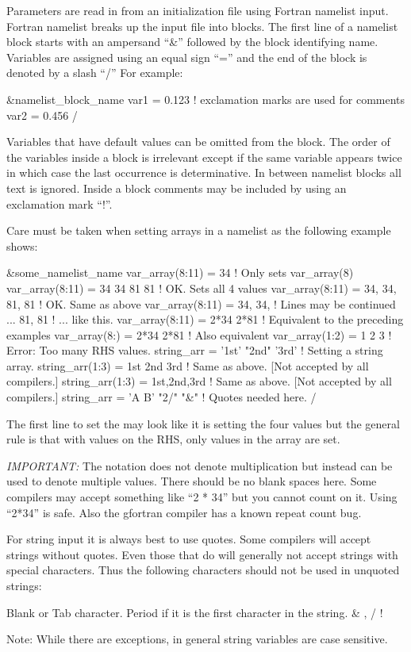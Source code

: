 Parameters are read in from an initialization file using Fortran namelist input. Fortran namelist
breaks up the input file into blocks. The first line of a namelist block starts with an ampersand
``\&'' followed by the block identifying name. Variables are assigned using an equal sign ``='' and
the end of the block is denoted by a slash ``/'' For example:
\begin{example}
  &namelist_block_name
    var1 = 0.123   ! exclamation marks are used for comments
    var2 = 0.456
  /
\end{example}
Variables that have default values can be omitted from the block.  The order of the variables inside
a block is irrelevant except if the same variable appears twice in which case the last occurrence is
determinative.  In between namelist blocks all text is ignored. Inside a block comments may be
included by using an exclamation mark ``!''.

Care must be taken when setting arrays in a namelist as the following example shows:
\begin{example}
  &some_namelist_name
    var_array(8:11) = 34             ! Only sets var_array(8)
    var_array(8:11) = 34 34 81 81    ! OK. Sets all 4 values
    var_array(8:11) = 34, 34, 81, 81 ! OK. Same as above
    var_array(8:11) = 34, 34,        ! Lines may be continued ...
                      81, 81         !   ... like this.
    var_array(8:11) = 2*34 2*81      ! Equivalent to the preceding examples
    var_array(8:)   = 2*34 2*81      ! Also equivalent
    var_array(1:2) = 1 2 3           ! Error: Too many RHS values.
    string_arr = '1st' "2nd" '3rd'   ! Setting a string array.
    string_arr(1:3) = 1st 2nd 3rd    ! Same as above. [Not accepted by all compilers.]
    string_arr(1:3) = 1st,2nd,3rd    ! Same as above. [Not accepted by all compilers.]
    string_arr = 'A B' "2/" "&"      ! Quotes needed here.
  /
\end{example}
The first line to set the  may look like it is setting the four values
 but the general rule is that with  values on the RHS, only  values
in the array are set.

{\em IMPORTANT:} The notation  does not denote multiplication but instead can be used to
denote multiple values. There should be no blank spaces here. Some compilers may accept something
like ``2 * 34'' but you cannot count on it. Using ``2*34'' is safe. Also the gfortran compiler has a known
repeat count bug.

For string input it is always best to use quotes. Some compilers will accept strings without
quotes. Even those that do will generally not accept strings with special characters.  Thus the
following characters should not be used in unquoted strings:
\begin{example}
  Blank or Tab character.
  Period if it is the first character in the string.
  &   ,   /    !   %
\end{example}
Note: While there are exceptions, in general \tao string variables are
case sensitive.

